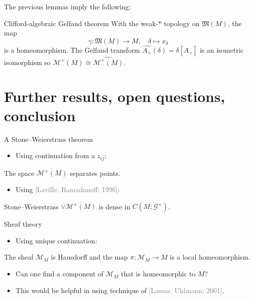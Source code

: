 \documentclass[aspectratio=169]{beamer}
\newcommand\grey[1]{\textcolor{gray}{#1}}
\newcommand{\G}{\mathcal{G}}
\newcommand{\characters}{\mathfrak{M}}
\newcommand{\monogenics}{\mathcal{M}}
\begin{document}
\begin{frame}{}
\vfill
The previous lemmas imply the following:
\pause
\begin{thm*}{Clifford-algebraic Gelfand theorem}{}
With the weak-$\ast$ topology on $\characters(M)$, the map
\[
\gamma \colon \characters(M) \to M, \quad \delta \mapsto x_\delta
\]
is a homeomorphism. The Gelfand transform $\widehat{A_+}(\delta)=\delta[A_+]$ is an isometric isomorphism so $\monogenics^+(M) \cong \widehat{\monogenics^+(M)}$.
\end{thm*}
\vfill
\end{frame}




\section{Further results, open questions, conclusion}
%
\begin{frame}{A Stone--Weierstrass theorem}{}
\vfill
\pause
\begin{itemize}
  \item Using continuation from a $z_{ij}$:
\end{itemize}
\begin{lemm*}{}{}
The space $\overline{\monogenics^+(M)}$ separates points.
\end{lemm*}
\pause
\begin{itemize}
  \item Using \grey{[Laville, Ramadanoff: 1996]}:
\end{itemize}
\begin{thm*}{Stone--Weierstrass}{}
$\vee \overline{\monogenics^+(M)}$ is dense in $C(M;\G^+)$.
\end{thm*}
\vfill
\end{frame}

\begin{frame}{Sheaf theory}
\vfill
\pause
\begin{itemize}
  \item Using unique continuation:
\end{itemize}
\pause
\begin{thm*}{}{}
The sheaf $\monogenics_M$ is Hausdorff and the map $\pi \colon \monogenics_M \to M$ is a local homeomorphism.
\end{thm*}
\pause
\begin{itemize}
  \item Can one find a component of $\monogenics_M$ that is homeomorphic to $M$?
  \pause
  \item This would be helpful in using technique of \grey{[Lassas, Uhlmann: 2001]}.
\end{itemize}
\vfill
\end{frame}
\end{document}
